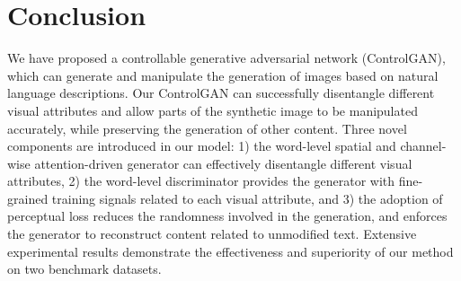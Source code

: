 \documentclass{article}
\begin{document}
\section{Conclusion}
We have proposed a controllable generative adversarial network (ControlGAN), which can generate and manipulate the generation of images based on natural language descriptions. Our ControlGAN can successfully disentangle different visual attributes and allow parts of the synthetic image to be manipulated accurately, while preserving the generation of other content. Three novel components are introduced in our model: 1) the word-level spatial and channel-wise attention-driven generator can effectively disentangle different visual attributes, 2) the word-level discriminator provides the generator with fine-grained training signals related to each visual attribute, and 3) the adoption of perceptual loss reduces the randomness involved in the generation, and enforces the generator to reconstruct content related to unmodified text.
Extensive experimental results demonstrate the effectiveness and superiority of our method on two benchmark datasets.


\end{document}
